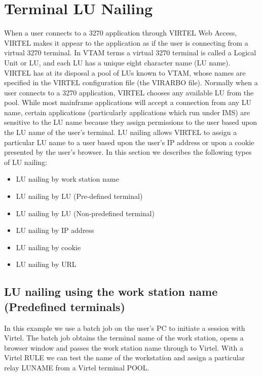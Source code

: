 \documentclass[letterpaper,10pt,english]{sphinxmanual}
\begin{document}
\chapter{Terminal LU Nailing}
\label{\detokenize{Customization:terminal-lu-nailing}}\label{\detokenize{Customization:index-55}}
When a user connects to a 3270 application through VIRTEL Web Access, VIRTEL makes it appear to the application as if the user is connecting from a virtual 3270 terminal. In VTAM terms a virtual 3270 terminal is called a Logical Unit or LU, and each LU has a unique eight character name (LU name). VIRTEL has at its disposal a pool of LUs known to VTAM,
whose names are specified in the VIRTEL configuration file (the VIRARBO file). Normally when a user connects to a 3270 application, VIRTEL chooses any available LU from the pool.
While most mainframe applications will accept a connection from any LU name, certain applications (particularly applications which run under IMS) are sensitive to the LU name because they assign permissions to the user based upon the LU name of the user’s terminal. LU nailing allows VIRTEL to assign a particular LU name to a user based upon the user’s IP address or upon a cookie presented by the user’s browser. In this section we describes the following types of LU nailing:
\begin{itemize}
\item {} 
LU nailing by work station name

\item {} 
LU nailing by LU (Pre-defined terminal)

\item {} 
LU nailing by LU (Non-predefined terminal)

\item {} 
LU nailing by IP address

\item {} 
LU nailing by cookie

\item {} 
LU nailing by URL

\end{itemize}

\ignorespaces 

\section{LU nailing using the work station name (Predefined terminals)}
\label{\detokenize{Customization:lu-nailing-using-the-work-station-name-predefined-terminals}}\label{\detokenize{Customization:index-56}}
In this example we use a batch job on the user’s PC to initiate a session with Virtel. The batch job obtains the terminal name of the work station, opens a browser window and passes the work station name through to Virtel. With a Virtel RULE we can test the name of the workstation and assign a particular relay LUNAME from a Virtel terminal POOL.
\end{document}

